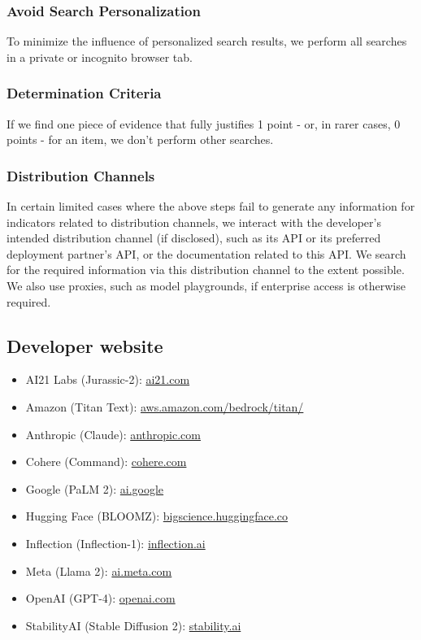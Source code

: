 \subsubsection{Avoid Search Personalization}
To minimize the influence of personalized search results, we perform all searches in a private or incognito browser tab.

\subsubsection{Determination Criteria}
If we find one piece of evidence that fully justifies 1 point - or, in rarer cases, 0 points - for an item, we don't perform other searches.

\subsubsection{Distribution Channels}
In certain limited cases where the above steps fail to generate any information for indicators related to distribution channels, we interact with the developer’s intended distribution channel (if disclosed), such as its API or its preferred deployment partner’s API, or the documentation related to this API. We search for the required information via this distribution channel to the extent possible. We also use proxies, such as model playgrounds, if enterprise access is otherwise required.

\subsection{Developer website}

\begin{itemize}
    \item AI21 Labs (Jurassic-2): \url{ai21.com}
    \item Amazon (Titan Text): \url{aws.amazon.com/bedrock/titan/}
    \item Anthropic (Claude): \url{anthropic.com}
    \item Cohere (Command): \url{cohere.com}
    \item Google (PaLM 2): \url{ai.google}
    \item Hugging Face (BLOOMZ): \url{bigscience.huggingface.co}
    \item Inflection (Inflection-1): \url{inflection.ai}
    \item Meta (Llama 2): \url{ai.meta.com}
    \item OpenAI (GPT-4): \url{openai.com}
    \item StabilityAI (Stable Diffusion 2): \url{stability.ai}
    
\end{itemize}

